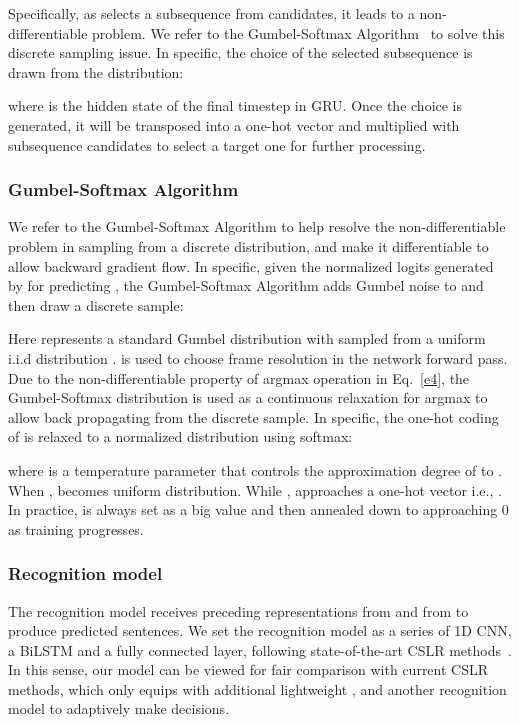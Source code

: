 \documentclass[sigconf]{acmart}
\begin{document}
Specifically, as  selects a subsequence from  candidates, it leads to a non-differentiable problem. We refer to the Gumbel-Softmax Algorithm~\cite{jang2016categorical} to solve this discrete sampling issue. In specific, the choice  of the selected subsequence is drawn from the distribution:
   
where  is the hidden state of the final timestep in GRU.
Once the choice  is generated, it will be transposed into a one-hot vector and multiplied with subsequence candidates to select a target one for further processing.
  

\subsubsection{Gumbel-Softmax Algorithm}
We refer to the Gumbel-Softmax Algorithm\cite{jang2016categorical} to help resolve the non-differentiable problem in sampling  from a discrete distribution, and make it differentiable to allow backward gradient flow. In specific, given the normalized logits  generated by  for predicting , the Gumbel-Softmax Algorithm adds Gumbel noise  to  and then draw a discrete sample:
  
Here  represents a standard Gumbel distribution with  sampled from a uniform i.i.d distribution .  is used to choose frame resolution in the network forward pass. Due to the non-differentiable property of argmax operation in Eq.~\ref{e4}, the Gumbel-Softmax distribution is used as a continuous relaxation for argmax to allow back propagating from the discrete sample. In specific, the one-hot coding of  is relaxed to a normalized distribution  using softmax:
  
where  is a temperature parameter that controls the approximation degree of  to . When ,  becomes uniform distribution. While ,  approaches a one-hot vector i.e., . In practice,  is always set as a big value and then annealed down to approaching 0 as training progresses.

\subsubsection{Recognition model}
The recognition model receives preceding representations  from  and  from  to produce predicted sentences. We set the recognition model as a series of 1D CNN, a BiLSTM and a fully connected layer, following state-of-the-art CSLR methods~\cite{Min_2021_ICCV,hao2021self}. In this sense, our model can be viewed for fair comparison with current CSLR methods, which only equips with additional lightweight ,  and another recognition model to adaptively make decisions.
  
\end{document}
